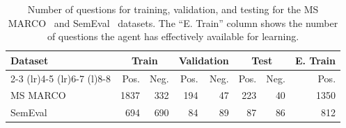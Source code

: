 \begin{table}
\renewcommand{\tabcolsep}{4.0pt}
\caption{Number of questions for training, validation, and testing for the MS MARCO~\cite{Nguyen2016MSMARCO}
and SemEval~\cite{SharpCausalQAEmbeddings2016} datasets. The ``E. Train'' column shows the number of questions 
the agent has effectively available for learning.}
\label{table-evaluation-datasets}
\centering
\begin{tabular}{@{}lrrrrrrr@{}} 
  \toprule
  \textbf{Dataset} & \multicolumn{2}{c}{\textbf{Train}} & \multicolumn{2}{c}{\textbf{Validation}} & \multicolumn{2}{c}{\textbf{Test}} & \textbf{E. Train} \\ \cmidrule(lr){2-3} \cmidrule(lr){4-5}  \cmidrule(lr){6-7} \cmidrule(l){8-8} 
  & Pos. & Neg. & Pos. & Neg. & Pos. & Neg.  & Pos. \\
  \toprule
  MS MARCO & 1837 & 332 & 194 & 47 & 223 & 40 & 1350 \\
  SemEval  &  694 & 690 &  84 & 89 &  87 & 86 &  812 \\
  \bottomrule
\end{tabular}
\end{table}
